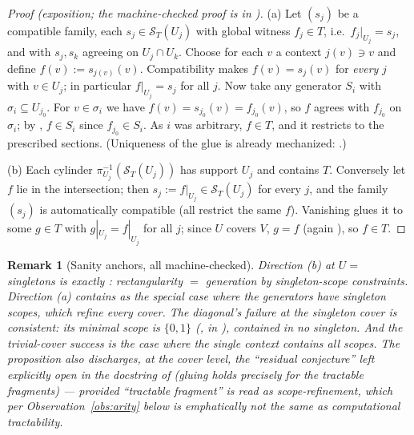 \documentclass[11pt]{article}
\newtheorem{remark}{Remark}
\newcommand{\Sec}{\mathcal S}
\begin{document}
\begin{proof}[Proof (exposition; the machine-checked proof is in
)]
(a) Let $(s_j)$ be a compatible family, each $s_j \in \Sec_T(U_j)$
with global witness $f_j \in T$, i.e.\ $f_j|_{U_j} = s_j$, and with
$s_j, s_k$ agreeing on $U_j \cap U_k$.  Choose for each $v$ a context
$j(v) \ni v$ and define $f(v) := s_{j(v)}(v)$.  Compatibility makes
$f(v) = s_j(v)$ for \emph{every} $j$ with $v \in U_j$; in particular
$f|_{U_j} = s_j$ for all $j$.  Now take any generator $S_i$ with
$\sigma_i \subseteq U_{j_0}$.  For $v \in \sigma_i$ we have $f(v) =
s_{j_0}(v) = f_{j_0}(v)$, so $f$ agrees with $f_{j_0}$ on
$\sigma_i$; by , $f \in S_i$ since $f_{j_0} \in S_i$.
As $i$ was arbitrary, $f \in T$, and it restricts to the prescribed
sections.  (Uniqueness of the glue is already mechanized:
.)

(b) Each cylinder $\pi_{U_j}^{-1}(\Sec_T(U_j))$ has support $U_j$ and
contains $T$.  Conversely let $f$ lie in the intersection; then $s_j
:= f|_{U_j} \in \Sec_T(U_j)$ for every $j$, and the family $(s_j)$ is
automatically compatible (all restrict the same $f$).  Vanishing
glues it to some $g \in T$ with $g|_{U_j} = f|_{U_j}$ for all $j$;
since $U$ covers $V$, $g = f$ (again ), so $f
\in T$.
\end{proof}

\begin{remark}[Sanity anchors, all machine-checked]
Direction (b) at $U = $ singletons is exactly
: rectangularity $=$ generation by
singleton-scope constraints.  Direction (a) contains
 as the special case where the
generators have singleton scopes, which refine \emph{every} cover.
The diagonal's failure at the singleton cover is consistent: its
minimal scope is $\{0,1\}$ (, in
), contained in no singleton.  And the trivial-cover
success  is the case where the single
context contains all scopes.  The proposition also discharges, at the
cover level, the ``residual conjecture'' left explicitly open in the
docstring of  (gluing holds precisely for
the tractable fragments) --- provided ``tractable fragment'' is read
as \emph{scope-refinement}, which per
Observation~\ref{obs:arity} below is emphatically \emph{not} the same
as computational tractability.
\end{remark}
\end{document}
